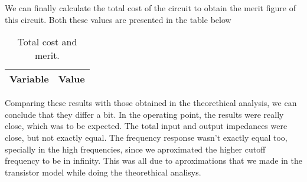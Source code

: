 We can finally calculate the total cost of the circuit to obtain the merit figure of this circuit. Both these values are presented in the table below

\begin{table}[H]
  \centering
  \begin{tabular}{|l|r|}
    \hline    
    {\bf Variable} & {\bf Value} \\ \hline
    
  \end{tabular}
  \caption{Total cost and merit.}
\end{table}

Comparing these results with those obtained in the theorethical analysis, we can conclude that they differ a bit. In the operating point, the results were really close, which was to be expected. The total input and output impedances were close, but not exactly equal. The frequency response wasn't exactly equal too, specially in the high frequencies, since we aproximated the higher cutoff frequency to be in infinity. This was all due to aproximations that we made in the transistor model while doing the theorethical analisys.





